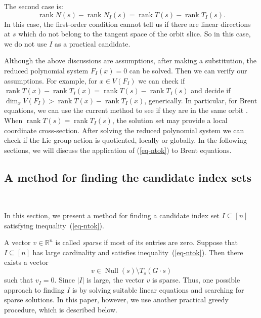 \documentclass[reqno]{amsart}
\theoremstyle{definition}
\numberwithin{equation}{section}
\theoremstyle{remark}
\newcounter{condition}
\begin{document}
The second case is: 
$$\operatorname{rank}N(s)-\operatorname{rank}N_I(s)=\operatorname{rank}T(s)-\operatorname{rank}T_I(s).$$
In this case, the first-order condition cannot tell us if there are 
linear directions at $s$ which do not belong to the tangent space of the orbit slice. So in this case,  we do not use $I$ as a practical candidate.

Although the above discussions are assumptions, after making a substitution, the reduced polynomial system $F_I(x)=0$ can be solved.
Then we can verify our assumptions. For example,  for $x\in V(F_I)$ we can check if $\operatorname{rank}T(x)-\operatorname{rank}T_I(x)=\operatorname{rank}T(s)-\operatorname{rank}T_I(s)$ and decide if $\dim_x V(F_I)>\operatorname{rank}T(x)-\operatorname{rank}T_I(x)$, generically. In particular, for Brent equations, we can use the current method to see if they are in the same orbit \cite{berger22,Heule21,kaumoo22,Tichav-21}.
When $\operatorname{rank}T(s)=\operatorname{rank}T_I(s)$, the solution set may provide a local coordinate cross-section. After solving the reduced polynomial system we can check if the Lie group action is quotiented, locally or globally. In the following sections, we will discuss the application of (\ref{eq-ntok}) to Brent equations.

\subsection{A method for finding the candidate index sets}\label{subs-findI}
\

In this section, we present a method for finding a
candidate index set $I\subseteq[n]$ satisfying inequality~(\ref{eq-ntok}).

A vector $v\in\mathbb{R}^n$ is called \emph{sparse} if most of its
entries are zero. Suppose that $I\subseteq[n]$ has large cardinality
and satisfies inequality~(\ref{eq-ntok}). Then there exists a vector
$$v\in \operatorname{Null}(s)\setminus T_s(G\cdot s)$$
such that $v_I=0$. Since $|I|$ is large, the vector $v$ is sparse.
Thus, one possible approach to finding $I$ is by solving suitable linear equations and searching for sparse solutions. In this paper, however, we use another practical greedy procedure, which is described below.
\end{document}

